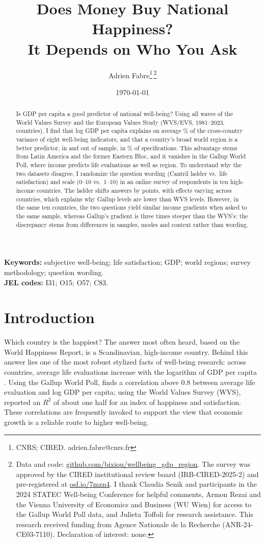 \documentclass[12pt]{article}
\title{Does Money Buy National Happiness?\\ It Depends on Who You Ask}
\author{}
\date{}
\author{Adrien Fabre\thanks{CNRS; CIRED. adrien.fabre@cnrs.fr}\,\thanks{Data and code: \href{https://github.com/bixiou/wellbeing_gdp_region}{github.com/bixiou/wellbeing\_gdp\_region}. %
    The survey was approved by the CIRED institutional review board (IRB-CIRED-2025-2) and pre-registered at \href{https://osf.io/7mzn4}{osf.io/7mzn4}. I thank Claudia Senik and participants in the 2024 STATEC Well-being Conference for helpful comments, Armon Rezai and the Vienna University of Economics and Business (WU Wien) for access to the Gallup World Poll data, and Julieta Toffoli for research assistance. This research received funding from Agence Nationale de la Recherche (ANR-24-CE03-7110). Declaration of interest: none.}}
\date{\today}
\newif\ifblind
\begin{document}
\maketitle

\begin{abstract}
\noindent Is GDP per capita a good predictor of national well-being? Using all waves of the World Values Survey and the European Values Study (WVS/EVS, 1981--2023, \nWVSCountries countries), I find that log GDP per capita explains on average \meanRtwoIncomePPP\% of the cross-country variance of eight well-being indicators, and that a country's broad world region is a better predictor, in and out of sample, in \shareRegionBetterWVS\% of \nSpecsWVS specifications. This advantage stems from Latin America and the former Eastern Bloc, and it vanishes in the Gallup World Poll, where income predicts life evaluations as well as region. To understand why the two datasets disagree, I randomize the question wording (Cantril ladder vs.\ life satisfaction) and scale (0--10 vs.\ 1--10) in an online survey of \nFabre respondents in ten high-income countries. The ladder shifts answers by \effectLadder points, with effects varying across countries, which explains why Gallup levels are lower than WVS levels. However, in the same ten countries, the two questions yield similar income gradients when asked to the same sample, whereas Gallup's gradient is three times steeper than the WVS's: the discrepancy stems from differences in samples, modes and context rather than wording.
\end{abstract}

\noindent\textbf{Keywords:} subjective well-being; life satisfaction; GDP; world regions; survey methodology; question wording.\\
\noindent\textbf{JEL codes:} I31; O15; O57; C83.

\ifblind
  \doublespacing
  \linenumbers
\else
  \tableofcontents
\fi

\clearpage

\section{Introduction}\label{sec:intro}

Which country is the happiest? The answer most often heard, based on the World Happiness Report, is a Scandinavian, high-income country. Behind this answer lies one of the most robust stylized facts of well-being research: across countries, average life evaluations increase with the logarithm of GDP per capita \citep{deaton_income_2008,stevenson_economic_2008,sacks_new_2012}. Using the Gallup World Poll, \citet{deaton_income_2008} finds a correlation above 0.8 between average life evaluation and log GDP per capita; using the World Values Survey (WVS), \citet{inglehart_genes_2000} reported an $R^2$ of about one half for an index of happiness and satisfaction. These correlations are frequently invoked to support the view that economic growth is a reliable route to higher well-being.
\end{document}
